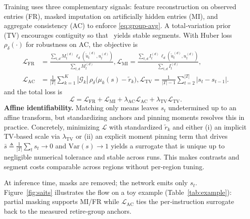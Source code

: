 Training uses three complementary signals: feature reconstruction on observed entries (FR), masked imputation on artificially hidden entries (MI), and aggregate consistency (AC) to enforce \eqref{eq:group-avg}. A total‑variation prior (TV) encourages contiguity so that \cpd\ yields stable segments. With Huber loss \(\rho_\delta(\cdot)\) for robustness on AC, the objective is 
{
\footnotesize 
\begin{align}
\mathcal{L}_{\mathrm{FR}} &= \frac{\sum_{t,d}M_t^{(d)}\,\ell_d(\tilde{u}_t^{(d)},u_t^{(d)})}{\sum_{t,d}M_t^{(d)}}, 
\mathcal{L}_{\mathrm{MI}} = \frac{\sum_{t,d}I_t^{(d)}\,\ell_d(\tilde{u}_t^{(d)},u_t^{(d)})}{\sum_{t,d}I_t^{(d)}}, \\
\mathcal{L}_{\mathrm{AC}} &= \frac{1}{|T|}\sum_{k=1}^K |\mathcal{G}_k|\,\rho_\delta\!\big(\mu_k(s)-\tilde{r}_k\big), 
\mathcal{L}_{\mathrm{TV}} = \frac{1}{|T|-1}\sum_{t=2}^{|T|} |s_t-s_{t-1}|. 
\end{align} 
\normalsize
}
and the total loss is
\begin{equation}
\mathcal{L}=\mathcal{L}_{\mathrm{FR}}+\mathcal{L}_{\mathrm{MI}}+\lambda_{\mathrm{AC}}\mathcal{L}_{\mathrm{AC}}+\lambda_{\mathrm{TV}}\mathcal{L}_{\mathrm{TV}}.
\end{equation}
\textbf{Affine identifiability.} Matching only means leaves \(s_t\) undetermined up to an affine transform, but standardizing anchors and pinning moments resolves this in practice. Concretely, minimizing \(\mathcal{L}\) with standardized \(\tilde{r}_k\) and either (i) an implicit TV‑based scale via \(\lambda_{\mathrm{TV}}\) or (ii) an explicit moment pinning term that drives \(\bar{s}\!\triangleq\!\tfrac{1}{|T|}\sum_ts_t\!\to\!0\) and \(\mathrm{Var}(s)\!\to\!1\) yields a surrogate that is unique up to negligible numerical tolerance and stable across runs. This makes contrasts and segment costs comparable across regions without per‑region tuning.

At inference time, masks are removed; the network emits only \(s_t\). Figure~\ref{fig:saits} illustrates the flow on a toy example (Table~\ref{tab:example}): partial masking supports MI/FR while \(\mathcal{L}_{\mathrm{AC}}\) ties the per‑instruction surrogate back to the measured retire‑group anchors.

